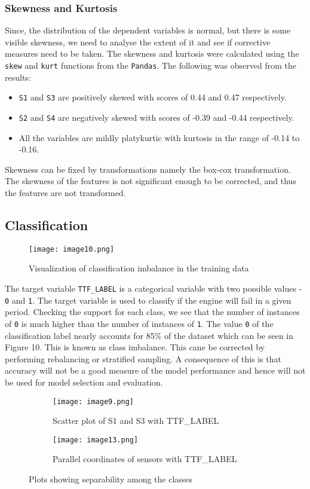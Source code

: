 \documentclass{article}
\begin{document}
\subsubsection{Skewness and Kurtosis}
Since, the distribution of the dependent variables is normal, but there is some visible skewness, we need to analyse the extent of it and see if corrective measures need to be taken.
The skewness and kurtosis were calculated using the \texttt{skew} and \texttt{kurt} functions from the \texttt{Pandas}. The following was observed from the results:
\begin{itemize}
	\item \texttt{S1} and \texttt{S3} are positively skewed with scores of 0.44 and 0.47 respectively.
	\item \texttt{S2} and \texttt{S4} are negatively skewed with scores of -0.39 and -0.44 respectively.
	\item All the variables are mildly platykurtic with kurtosis in the range of -0.14 to -0.16.
\end{itemize}
Skewness can be fixed by transformations namely the box-cox transformation.
The skewness of the features is not significant enough to be corrected, and thus the features are not transformed.

\subsection{Classification}
\begin{wrapfigure}[12]{r}{0.5\textwidth}
    \vspace{-45pt}
	\texttt{[image: image10.png]}
	\caption{Visualization of classification imbalance in the training data}
\end{wrapfigure}
The target variable \texttt{TTF\_LABEL} is a categorical variable with two possible values - \texttt{0} and \texttt{1}. The target variable is used to classify if the engine will fail in a given period.
Checking the support for each class, we see that the number of instances of \texttt{0} is much higher than the number of instances of \texttt{1}. The value \texttt{0} of the classification label nearly accounts for 85\% of the dataset which can be seen in Figure 10.
This is known as class imbalance. This cane be corrected by performing rebalancing or stratified sampling. 
A consequence of this is that accuracy will not be a good measure of the model performance and hence will not be used for model selection and evaluation.
\begin{figure}[h]
	\begin{subfigure}{.5\textwidth}
		\centering
		\texttt{[image: image9.png]}
		\caption{Scatter plot of S1 and S3 with TTF\_LABEL}
		\label{fig:sfig1}
	\end{subfigure}%
	\begin{subfigure}{.5\textwidth}
		\centering
		\texttt{[image: image13.png]}
		\caption{Parallel coordinates of sensors with TTF\_LABEL}
		\label{fig:sfig2}
	\end{subfigure}
	\caption{Plots showing separability among the classes}
	\label{fig:fig}
\end{figure}
\newpage
\end{document}
